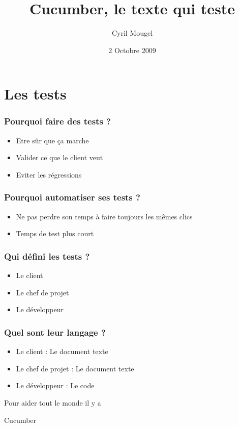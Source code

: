 \documentclass{beamer}
\title{Cucumber, le texte qui teste}
\author{Cyril Mougel}
\institute{AF83}
\date{2 Octobre 2009}
\begin{document}
\begin{frame}
    \titlepage
\end{frame}

\Large{}

\section{Les tests}

\begin{frame}
  \frametitle{Pourquoi faire des tests ?}
  \begin{itemize}
    \item Etre sûr que ça marche
    \item Valider ce que le client veut 
    \item Eviter les r\'egressions
  \end{itemize}
\end{frame}

\begin{frame}
  \frametitle{Pourquoi automatiser ses tests ?}
  \begin{itemize}
    \item Ne pas perdre son temps à faire toujours les mêmes clics
    \item Temps de test plus court
  \end{itemize}
\end{frame}

\begin{frame}
  \frametitle{Qui d\'efini les tests ?}
  \begin{itemize}
    \item Le client
    \item Le chef de projet
    \item Le d\'eveloppeur
  \end{itemize}
\end{frame}

\begin{frame}
  \frametitle{Quel sont leur langage ?}
  \begin{itemize}
    \item Le client : Le document texte
    \item Le chef de projet : Le document texte
    \item Le d\'eveloppeur : Le code
  \end{itemize}
\end{frame}

\begin{frame}
  \begin{center}
  \Large{}
  Pour aider tout le monde il y a 
  \end{center}
  \begin{center}
    \Huge{}
    Cucumber
  \end{center}
\end{frame}
\end{document}
